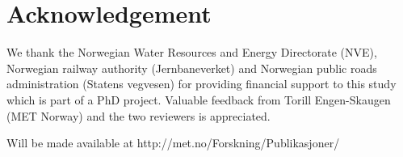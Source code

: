 \documentclass[12pt,a4paper,english]{article}
\begin{document}
\section{Acknowledgement}

We thank the Norwegian Water Resources and Energy Directorate (NVE), Norwegian railway authority (Jernbaneverket) and Norwegian public roads administration (Statens vegvesen) for providing financial support to this study which is part of a PhD project. Valuable feedback from Torill Engen-Skaugen (MET Norway) and the two reviewers is appreciated.



\vspace{10mm}
\noindent*Will be made available at http://met.no/Forskning/Publikasjoner/
\end{document}
